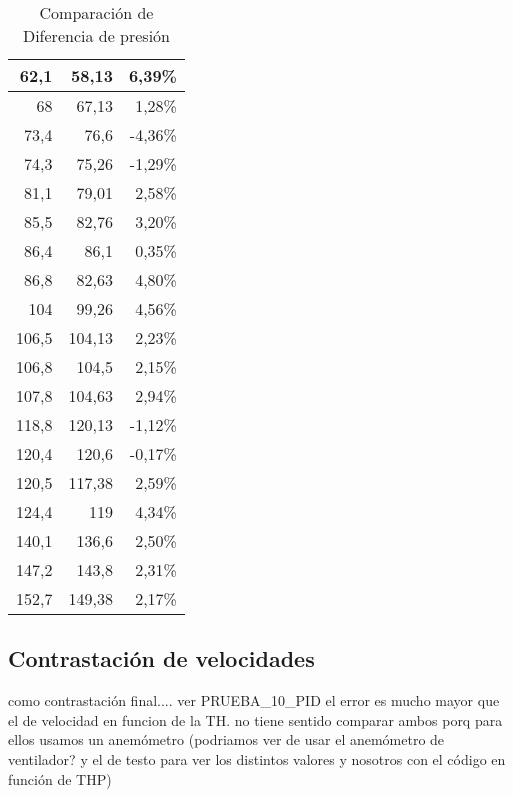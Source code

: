 \begin{table}[h!]
\begin{tabular}{|r|r|r}
			62,1 & 58,13 & \multicolumn{1}{r|}{6,39\%} \\ \hline
			68 & 67,13 & \multicolumn{1}{r|}{1,28\%} \\ \hline
			73,4 & 76,6 & \multicolumn{1}{r|}{-4,36\%} \\ \hline
			74,3 & 75,26 & \multicolumn{1}{r|}{-1,29\%} \\ \hline
			81,1 & 79,01 & \multicolumn{1}{r|}{2,58\%} \\ \hline
			85,5 & 82,76 & \multicolumn{1}{r|}{3,20\%} \\ \hline
			86,4 & 86,1 & \multicolumn{1}{r|}{0,35\%} \\ \hline
			86,8 & 82,63 & \multicolumn{1}{r|}{4,80\%} \\ \hline
			104 & 99,26 & \multicolumn{1}{r|}{4,56\%} \\ \hline
			106,5 & 104,13 & \multicolumn{1}{r|}{2,23\%} \\ \hline
			106,8 & 104,5 & \multicolumn{1}{r|}{2,15\%} \\ \hline
			107,8 & 104,63 & \multicolumn{1}{r|}{2,94\%} \\ \hline
			118,8 & 120,13 & \multicolumn{1}{r|}{-1,12\%} \\ \hline
			120,4 & 120,6 & \multicolumn{1}{r|}{-0,17\%} \\ \hline
			120,5 & 117,38 & \multicolumn{1}{r|}{2,59\%} \\ \hline
			124,4 & 119 & \multicolumn{1}{r|}{4,34\%} \\ \hline
			140,1 & 136,6 & \multicolumn{1}{r|}{2,50\%} \\ \hline
			147,2 & 143,8 & \multicolumn{1}{r|}{2,31\%} \\ \hline
			152,7 & 149,38 & \multicolumn{1}{r|}{2,17\%} \\ \hline
		\end{tabular}
	\caption{Comparación de Diferencia de presión}
	\label{difpres}

\end{table}

\subsection{Contrastación de velocidades}
como contrastación final....
ver PRUEBA\_10\_PID
el error es mucho mayor que el de velocidad en funcion de la TH. no tiene sentido comparar ambos porq para ellos usamos  un anemómetro (podriamos ver de usar el anemómetro de ventilador? y el de testo para ver los distintos valores y nosotros con el código en función de THP)





